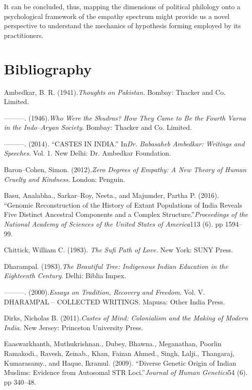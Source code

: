 It can be concluded, thus, mapping the dimensions of political philology onto a psychological framework of the empathy spectrum might provide us a novel perspective to understand the mechanics of hypothesis forming employed by its practitioners.


\section*{Bibliography}

\begin{thebibliography}{99}
\itemsep=0pt
 Ambedkar, B. R. (1941).\textit{Thoughts on Pakistan}. Bombay: Thacker and Co. Limited.

  ———. (1946).\textit{Who Were the Shudras? How They Came to Be the Fourth Varna in the Indo–Aryan Society}. Bombay: Thacker and Co. Limited.

  ———. (2014). “CASTES IN INDIA.” In\textit{Dr. Babasaheb Ambedkar: Writings and Speeches}. Vol. 1. New Delhi: Dr. Ambedkar Foundation.

  Baron–Cohen, Simon. (2012).\textit{Zero Degrees of Empathy: A New Theory of Human Cruelty and Kindness}. London: Penguin.

  Basu, Analabha., Sarkar–Roy, Neeta., and Majumder, Partha P. (2016). “Genomic Reconstruction of the History of Extant Populations of India Reveals Five Distinct Ancestral Components and a Complex Structure.”\textit{Proceedings of the National Academy of Sciences of the United States of America}113 (6). pp 1594–99.

  Chittick, William C. (1983). \textit{The Sufi Path of Love.} New York: SUNY Press.

  Dharampal. (1983).\textit{The Beautiful Tree: Indigenous Indian Education in the Eighteenth Century}. Delhi: Biblia Impex.

  ———. (2000).\textit{Essays on Tradition, Recovery and Freedom}. Vol. V. DHARAMPAL – COLLECTED WRITINGS. Mapusa: Other India Press.

  Dirks, Nicholas B. (2011).\textit{Castes of Mind: Colonialism and the Making of Modern India}. New Jersey: Princeton University Press.

  Eaaswarkhanth, Muthukrishnan., Dubey, Bhawna., Meganathan, Poorlin Ramakodi., Ravesh, Zeinab., Khan, Faizan Ahmed., Singh, Lalji., Thangaraj, Kumarasamy., and Haque, Ikramul. (2009). “Diverse Genetic Origin of Indian Muslims: Evidence from Autosomal STR Loci.”\textit{Journal of Human Genetics}54 (6). pp 340–48.


\end{thebibliography}
